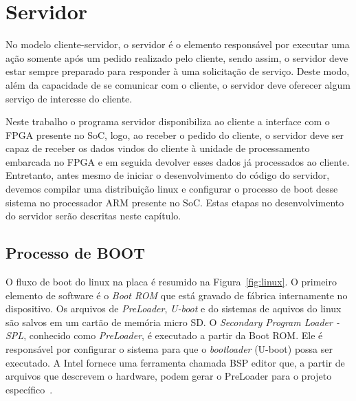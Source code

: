 \chapter{Servidor}\label{cap:server}

No modelo cliente-servidor, o servidor é o elemento responsável por executar uma ação somente após um pedido realizado pelo cliente, sendo assim, o servidor deve estar sempre preparado para responder à uma solicitação de serviço. Deste modo, além da capacidade de se comunicar com o cliente, o servidor deve oferecer algum serviço de interesse do cliente. 

Neste trabalho o programa servidor disponibiliza ao cliente a interface com o FPGA presente no SoC, logo, ao receber o pedido do cliente, o servidor deve ser capaz de receber os dados vindos do cliente à unidade de processamento embarcada no FPGA e em seguida devolver esses dados já processados ao cliente. Entretanto, antes mesmo de iniciar o desenvolvimento do código do servidor, devemos compilar uma distribuição linux e configurar o processo de boot desse sistema no processador ARM presente no SoC. Estas etapas no desenvolvimento do servidor serão descritas neste capítulo.

\section{Processo de BOOT}
O fluxo de boot do linux na placa é resumido na Figura~\ref{fig:linux}. O primeiro elemento de software é o \textit{Boot ROM} que está gravado de fábrica internamente no dispositivo. Os arquivos de \textit{PreLoader},\textit{ U-boot} e do sistemas de aquivos do linux são salvos em um cartão de memória micro SD\@. O \textit{Secondary Program Loader - SPL}, conhecido como \textit{PreLoader}, é executado a partir da Boot ROM\@. Ele é responsável por configurar o sistema para que o \textit{bootloader} (U-boot) possa ser executado. A Intel fornece uma ferramenta chamada BSP editor que, a partir de arquivos que descrevem o hardware, podem gerar o PreLoader para o projeto específico~\cite{SocLinux}.  

